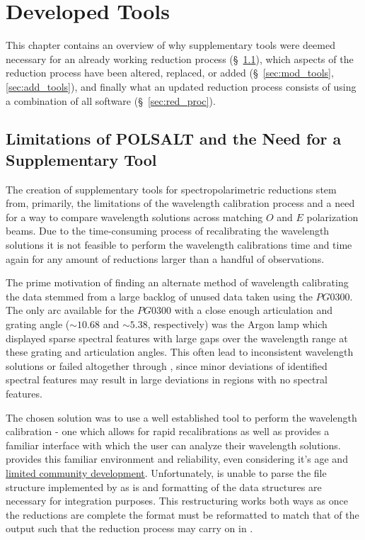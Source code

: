 \chapter{Developed Tools}

This chapter contains an overview of why supplementary tools were deemed necessary for an already working reduction process (\S~\ref{sec:polsalt_limits}), which aspects of the reduction process have been altered, replaced, or added (\S~\ref{sec:mod_tools}, \ref{sec:add_tools}), and finally what an updated reduction process consists of using a combination of all software (\S~\ref{sec:red_proc}).


\section{Limitations of POLSALT and the Need for a Supplementary Tool} \label{sec:polsalt_limits} %

The creation of supplementary tools for \polsalt spectropolarimetric reductions stem from, primarily, the limitations of the wavelength calibration process and a need for a way to compare wavelength solutions across matching $O$ and $E$ polarization beams. Due to the time-consuming process of recalibrating the wavelength solutions it is not feasible to perform the wavelength calibrations time and time again for any amount of reductions larger than a handful of observations.
\prgph

The prime motivation of finding an alternate method of wavelength calibrating the data stemmed from a large backlog of unused data taken using the $PG0300$. The only arc available for the $PG0300$ with a close enough articulation and grating angle ($\sim 10.68$ and $\sim 5.38$, respectively) was the Argon lamp which displayed sparse spectral features with large gaps over the wavelength range at these grating and articulation angles. This often lead to inconsistent wavelength solutions or failed altogether through \polsalt, since minor deviations of identified spectral features may result in large deviations in regions with no spectral features.
\prgph

The chosen solution was to use a well established tool to perform the wavelength calibration - one which allows for rapid recalibrations as well as provides a familiar interface with which the user can analyze their wavelength solutions. \iraf provides this familiar environment and reliability, even considering it's age and \hyperlink{https://github.com/iraf-community/iraf}{limited community development}. Unfortunately, \iraf is unable to parse the file structure implemented by \polsalt as is and formatting of the data structures are necessary for integration purposes. This restructuring works both ways as once the \iraf reductions are complete the format must be reformatted to match that of the \polsalt output such that the reduction process may carry on in \polsalt.
\prgph

